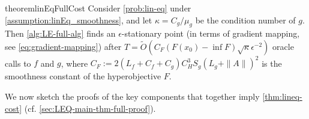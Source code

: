 \begin{restatable}{theorem}{linEqFullCost}\label{thm:lineq-cost}
    Consider  \cref{prob:lin-eq} under \cref{assumption:linEq_smoothness}, and let $\kappa=C_g/\mu_g$ be the condition number of $g$. Then \cref{alg:LE-full-alg}  finds an $\epsilon$-stationary point (in terms of gradient mapping, see \cref{eq:gradient-mapping}) after $T=\widetilde{O}(C_F (F(x_0)-\inf F)\sqrt{\kappa}\epsilon^{-2})$  oracle calls to $f$ and $g$, where $C_F:= 2(L_f +C_f+C_g)C_H^3 S_g (L_g +\|A\|)^2$ is the smoothness constant of the hyperobjective $F$.
\end{restatable}  
We now sketch the proofs of the key components that together imply \cref{thm:lineq-cost} (cf. \cref{sec:LEQ-main-thm-full-proof}).  
